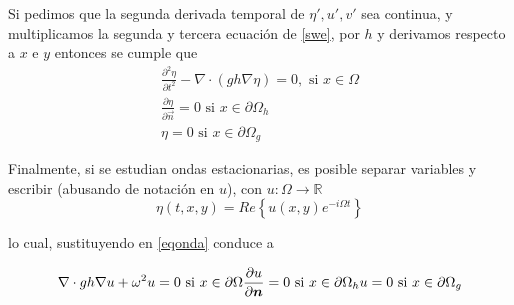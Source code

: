     Si pedimos que la segunda derivada temporal de $\eta',u',v'$ sea continua, y multiplicamos la segunda y tercera ecuaci\'on de \eqref{swe}, por $h$ y derivamos respecto a $x$ e $y$ entonces se cumple que 
    \begin{equation}
    	\begin{split}
    	\frac{\partial^2 \eta}{\partial t^2} - \nabla \cdot( gh \nabla \eta) = 0, \text{ si } x \in \Omega \\
        \frac{\partial \eta}{\partial \vec n} = 0 \text{ si } x \in \partial \Omega_h \\
        \eta = 0 \text{ si }x \in \partial \Omega_g
        \end{split}
     \label{eqonda}
    \end{equation}

	Finalmente, si se estudian ondas estacionarias, es posible separar variables y escribir (abusando de notaci\'on en $u$), con $u:\Omega \rightarrow \mathbb{R}$
    \begin{equation}
    	\eta(t,x,y) =Re\left\{ u(x,y) e^{-i\Omega t}\right\}
    \end{equation}
    
    lo cual, sustituyendo en \ref{eqonda} conduce a 
    
    \begin{equation}
    	\nabla \cdot gh \nabla u + \omega^2 u = 0 \text{ si } x \in \partial \Omega\\
        \frac{\partial u}{\partial \vec n} = 0 \text{ si } x \in \partial \Omega_h \\
        u = 0 \text{ si } x \in \partial \Omega_g
        \label{helmholtz}
    \end{equation}
    
    
    